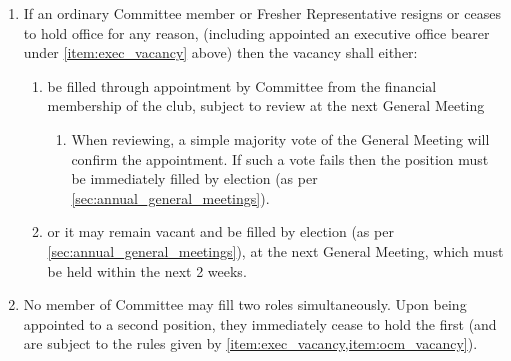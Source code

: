 \documentclass[a4paper]{article}
\begin{document}
\begin{enumerate}
    \item \label{item:ocm_vacancy} If an ordinary Committee member or Fresher Representative resigns or ceases to hold office for any reason, (including appointed an executive office bearer under \cref{item:exec_vacancy} above) then the vacancy shall either:
          \begin{enumerate}
              \item be filled through appointment by Committee from the financial membership of the club, subject to review at the next General Meeting
                    \begin{enumerate}
                        \item When reviewing, a simple majority vote of the General Meeting will confirm the appointment. If such a vote fails then the position must be immediately filled by election (as per \cref{sec:annual_general_meetings}).
                    \end{enumerate}
              \item or it may remain vacant and be filled by election (as per \cref{sec:annual_general_meetings}), at the next General Meeting, which must be held within the next 2 weeks.
          \end{enumerate}
    \item No member of Committee may fill two roles simultaneously. Upon being appointed to a second position, they immediately cease to hold the first (and are subject to the rules given by \cref{item:exec_vacancy,item:ocm_vacancy}).
\end{enumerate}
\end{document}
